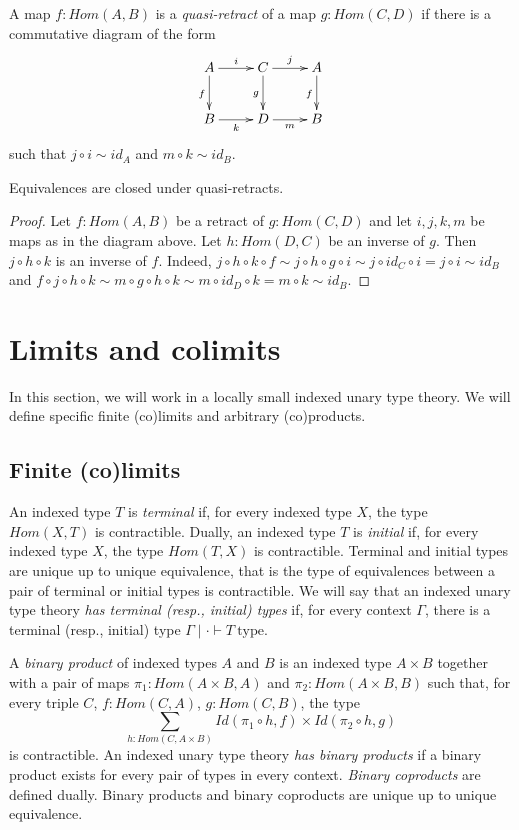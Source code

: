 \documentclass[reqno]{amsart}
\theoremstyle{definition}
\theoremstyle{remark}
\newcommand{\ob}{\mathrm{type}}
\newcommand{\fs}[1]{\mathit{#1}}
\newcommand{\Hom}{\fs{Hom}}
\newcommand{\Id}{\fs{Id}}
\newcommand{\id}{\fs{id}}
\numberwithin{figure}{section}
\begin{document}
A map $f : \Hom(A,B)$ is a \emph{quasi-retract} of a map $g : \Hom(C,D)$ if there is a commutative diagram of the form
\[ \xymatrix{ A \ar[r]^i \ar[d]_f & C \ar[r]^j \ar[d]_g & A \ar[d]_f \\
              B \ar[r]_k          & D \ar[r]_m          & B
            } \]
such that $j \circ i \sim \id_A$ and $m \circ k \sim \id_B$.

\begin{prop}
Equivalences are closed under quasi-retracts.
\end{prop}
\begin{proof}
Let $f : \Hom(A,B)$ be a retract of $g : \Hom(C,D)$ and let $i,j,k,m$ be maps as in the diagram above.
Let $h : \Hom(D,C)$ be an inverse of $g$.
Then $j \circ h \circ k$ is an inverse of $f$.
Indeed, $j \circ h \circ k \circ f \sim j \circ h \circ g \circ i \sim j \circ \id_C \circ i = j \circ i \sim \id_B$ and
$f \circ j \circ h \circ k \sim m \circ g \circ h \circ k \sim m \circ \id_D \circ k = m \circ k \sim \id_B$.
\end{proof}

\section{Limits and colimits}

In this section, we will work in a locally small indexed unary type theory.
We will define specific finite (co)limits and arbitrary (co)products.

\subsection{Finite (co)limits}

An indexed type $T$ is \emph{terminal} if, for every indexed type $X$, the type $\Hom(X,T)$ is contractible.
Dually, an indexed type $T$ is \emph{initial} if, for every indexed type $X$, the type $\Hom(T,X)$ is contractible.
Terminal and initial types are unique up to unique equivalence, that is the type of equivalences between a pair of terminal or initial types is contractible.
We will say that an indexed unary type theory \emph{has terminal (resp., initial) types} if, for every context $\Gamma$, there is a terminal (resp., initial) type $\Gamma \mid \cdot \vdash T\ \ob$.

A \emph{binary product} of indexed types $A$ and $B$ is an indexed type $A \times B$ together with a pair of maps $\pi_1 : \Hom(A \times B, A)$ and $\pi_2 : \Hom(A \times B, B)$
such that, for every triple $C$, $f : \Hom(C,A)$, $g : \Hom(C,B)$, the type
\[ \sum_{h : \Hom(C, A \times B)} \Id(\pi_1 \circ h, f) \times \Id(\pi_2 \circ h, g) \]
is contractible.
An indexed unary type theory \emph{has binary products} if a binary product exists for every pair of types in every context.
\emph{Binary coproducts} are defined dually.
Binary products and binary coproducts are unique up to unique equivalence.
\end{document}
